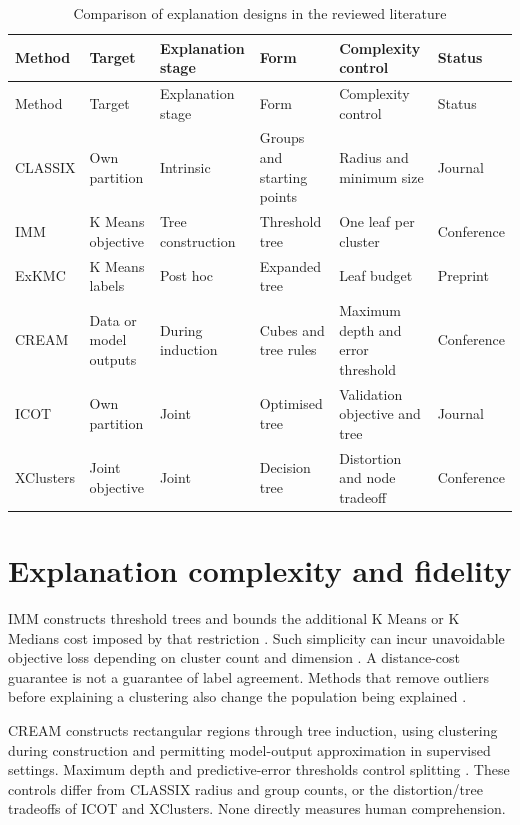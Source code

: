 {\setlength{\tabcolsep}{4pt}
\begin{longtable}{p{}p{}p{}p{}p{}p{}}
\caption{Comparison of explanation designs in the reviewed literature}\label{tab:literature_designs}\\
\toprule
Method & Target & Explanation stage & Form & Complexity control & Status \\
\midrule
\endfirsthead
\toprule
Method & Target & Explanation stage & Form & Complexity control & Status \\
\midrule
\endhead
CLASSIX & Own partition & Intrinsic & Groups and starting points & Radius and minimum size & Journal \\
IMM & K Means objective & Tree construction & Threshold tree & One leaf per cluster & Conference \\
ExKMC & K Means labels & Post hoc & Expanded tree & Leaf budget & Preprint \\
CREAM & Data or model outputs & During induction & Cubes and tree rules & Maximum depth and error threshold & Conference \\
ICOT & Own partition & Joint & Optimised tree & Validation objective and tree & Journal \\
XClusters & Joint objective & Joint & Decision tree & Distortion and node tradeoff & Conference \\
\bottomrule
\end{longtable}
}

\section{Explanation complexity and fidelity}

IMM constructs threshold trees and bounds the additional K Means or K Medians cost imposed by that restriction \citep{moshkovitz2020imm}. Such simplicity can incur unavoidable objective loss depending on cluster count and dimension \citep{laber2021price}. A distance-cost guarantee is not a guarantee of label agreement. Methods that remove outliers before explaining a clustering also change the population being explained \citep{bandyapadhyay2022explanation}.

CREAM constructs rectangular regions through tree induction, using clustering during construction and permitting model-output approximation in supervised settings. Maximum depth and predictive-error thresholds control splitting \citep{sabbatini2023cream}. These controls differ from CLASSIX radius and group counts, or the distortion/tree tradeoffs of ICOT and XClusters. None directly measures human comprehension.

